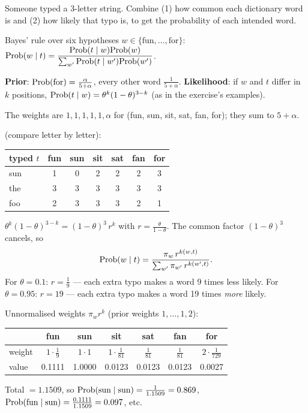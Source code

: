 \documentclass[11pt]{article}
\begin{document}
\begin{restate}
Someone typed a 3-letter string. Combine (1) how common each dictionary word is and (2) how likely that typo is, to get the probability of each intended word.
\end{restate}

\begin{recall}
Bayes' rule over six hypotheses $w\in\{\text{fun},\dots,\text{for}\}$:
$\mathrm{Prob}(w\mid t)=\dfrac{\mathrm{Prob}(t\mid w)\mathrm{Prob}(w)}{\sum_{w'}\mathrm{Prob}(t\mid w')\mathrm{Prob}(w')}$.
\end{recall}

\begin{keyidea}
\textbf{Prior}: $\mathrm{Prob}(\text{for})=\frac{\alpha}{5+\alpha}$, every other word $\frac1{5+\alpha}$. \textbf{Likelihood}: if $w$ and $t$ differ in $k$ positions, $\mathrm{Prob}(t\mid w)=\theta^k(1-\theta)^{3-k}$ (as in the exercise's examples).
\end{keyidea}

\solution
{}
The weights are $1,1,1,1,1,\alpha$ for (fun, sun, sit, sat, fan, for); they sum to $5+\alpha$.

 (compare letter by letter):
\begin{center}
\begin{tabular}{l|cccccc}\toprule
typed $t$ & fun & sun & sit & sat & fan & for\\\midrule
sun & 1 & 0 & 2 & 2 & 2 & 3\\
the & 3 & 3 & 3 & 3 & 3 & 3\\
foo & 2 & 3 & 3 & 3 & 2 & 1\\\bottomrule
\end{tabular}
\end{center}

$\theta^k(1-\theta)^{3-k}=(1-\theta)^3\,r^k$ with $r=\frac{\theta}{1-\theta}$. The common factor $(1-\theta)^3$ cancels, so
\[
\mathrm{Prob}(w\mid t)=\frac{\pi_w\,r^{k(w,t)}}{\sum_{w'}\pi_{w'}\,r^{k(w',t)}}.
\]
For $\theta=0.1$: $r=\frac19$ --- each extra typo makes a word 9 times less likely. For $\theta=0.95$: $r=19$ --- each extra typo makes a word 19 times \emph{more} likely.

Unnormalised weights $\pi_w r^k$ (prior weights $1,\dots,1,2$):
\begin{center}
\begin{tabular}{lcccccc}\toprule
 & fun & sun & sit & sat & fan & for\\\midrule
weight & $1\cdot\frac19$ & $1\cdot1$ & $1\cdot\frac1{81}$ & $\frac1{81}$ & $\frac1{81}$ & $2\cdot\frac1{729}$\\
value & 0.1111 & 1.0000 & 0.0123 & 0.0123 & 0.0123 & 0.0027\\\bottomrule
\end{tabular}
\end{center}
Total $=1.1509$, so $\mathrm{Prob}(\text{sun}\mid\text{sun})=\frac{1}{1.1509}=0.869$, $\mathrm{Prob}(\text{fun}\mid\text{sun})=\frac{0.1111}{1.1509}=0.097$, etc.
\end{document}
